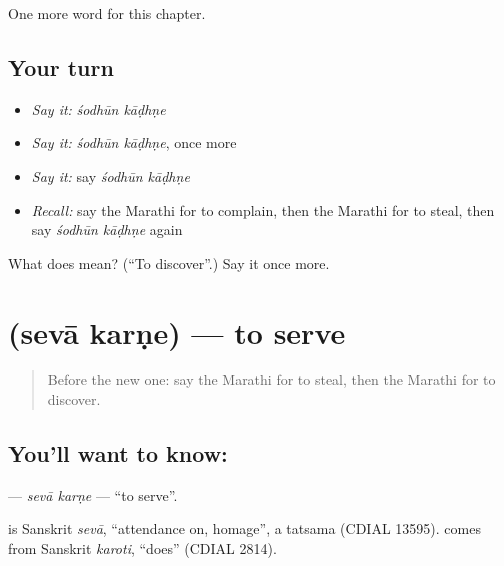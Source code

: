 \begin{grammarlens}[title={What you've built}]
One more word for this chapter.
\end{grammarlens}

\subsection*{Your turn}
\begin{itemize}
\raggedright
  \item \emph{Say it:} \emph{śodhūn kāḍhṇe}
  \item \emph{Say it:} \emph{śodhūn kāḍhṇe}, once more
  \item \emph{Say it:} say \emph{śodhūn kāḍhṇe}
  \item \emph{Recall:} say the Marathi for to complain, then the Marathi for to steal, then say \emph{śodhūn kāḍhṇe} again
\end{itemize}

\begin{tcolorbox}[breakable,colback=teal!4,colframe=teal!35!black,title={Before you move on}]
What does   mean? (\textquotedblleft{}To discover\textquotedblright{}.) Say it once more.
\end{tcolorbox}
\section[\texorpdfstring{\mr{सेवा} \mr{करणे} (sevā karṇe)}{सेवा करणे (sevā karṇe)}]{  (sevā karṇe) — to serve}

\label{lesson:MR-C254-seva-karne}



\begin{quote}
Before the new one: say the Marathi for to steal, then the Marathi for to discover.
\end{quote}

\subsection*{You'll want to know:  }
\textbf{ } — \emph{sevā karṇe} — \textquotedblleft{}to serve\textquotedblright{}.

\begin{cousinweb}
\textbf{} is Sanskrit \emph{sevā}, \textquotedblleft{}attendance on, homage\textquotedblright{}, a tatsama (CDIAL 13595). \textbf{} comes from Sanskrit \emph{karoti}, \textquotedblleft{}does\textquotedblright{} (CDIAL 2814).
\end{cousinweb}

